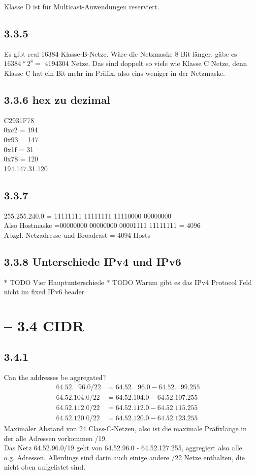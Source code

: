 \documentclass[a4paper,
			llpt,
			solution,
			accentcolor=tud2d,
			colorbacktitle
			]
			{tudexercise}
\newcommand{\8}{$\infty$}
\begin{document}
Klasse D ist für Multicast-Anwendungen reserviert.

\subsection{3.3.5}
Es gibt real 16384 Klasse-B-Netze. Wäre die Netzmaske 8 Bit länger, gäbe
es $16384*2^8 = $ 4194304  Netze. Das sind doppelt so viele wie Klasse C Netze,
denn Klasse C hat ein Bit mehr im Präfix, also eins weniger in der Netzmaske.

\subsection{3.3.6 hex zu dezimal}
C2931F78  \\
0xc2 = 194 \\
0x93 = 147 \\
0x1f = 31 \\
0x78 = 120 \\
194.147.31.120

\subsection{3.3.7}
255.255.240.0 = 11111111 11111111 11110000 00000000 \\
Also Hostmaske =00000000 00000000 00001111 11111111 = 4096 \\
Abzgl. Netzadresse und Broadcast = 4094 Hosts

\subsection{3.3.8 Unterschiede IPv4 und IPv6}
* TODO Vier Hauptunterschiede
* TODO Warum gibt es das IPv4 Protocol Feld nicht im fixed IPv6 header

\section{ -- 3.4 CIDR}
\subsection{3.4.1}
Can the addresses be aggregated?\\
\begin{align*}
64.52.\text{~~}96.0/22 &= 64.52.\text{~~}96.0 - 64.52.\text{~~}99.255 \\
64.52.104.0/22 &= 64.52.104.0 - 64.52.107.255 \\
64.52.112.0/22 &= 64.52.112.0 - 64.52.115.255 \\
64.52.120.0/22 &= 64.52.120.0 - 64.52.123.255
\end{align*}
Maximaler Abstand von 24 Class-C-Netzen, also ist die maximale Präfixlänge in
der alle Adressen vorkommen /19.\\
Das Netz 64.52.96.0/19 geht von 64.52.96.0 - 64.52.127.255, aggregiert also alle o.g. Adressen. Allerdings sind darin auch einige andere /22 Netze enthalten, die nicht oben aufgelistet sind.
\end{document}
